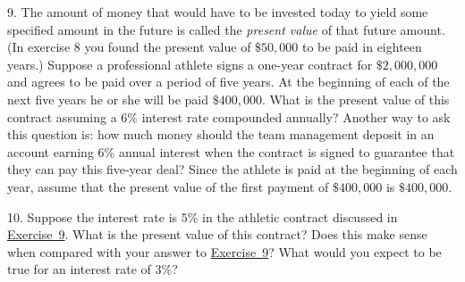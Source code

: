 \documentclass[10pt,]{book}
\theoremstyle{plain}
\theoremstyle{definition}
\theoremstyle{definition}
\theoremstyle{definition}
\numberwithin{equation}{section}
\begin{document}
\begin{exerciselist}
\begin{enumerate}[label=(\alph*)]
\end{enumerate}
\par\smallskip
\item[9.]\hypertarget{athletic-contract}{}\hypertarget{p-230}{}%
The amount of money that would have to be invested today to yield some specified amount in the future is called the \emph{present value} of that future amount.  (In exercise 8 you found the present value of \(\$50,000\) to be paid in eighteen years.)  Suppose a professional athlete signs a one-year contract for \(\$2,000,000\) and agrees to be paid over a period of five years.  At the beginning of each of the next five years he or she will be paid \(\$400,000\).  What is the present value of this contract assuming a \(6\%\) interest rate compounded annually?  Another way to ask this question is: how much money should the team management deposit in an account earning \(6\%\) annual interest when the contract is signed to guarantee that they can pay this five-year deal?  Since the athlete is paid at the beginning of each year, assume that the present value of the first payment of \(\$400,000\) is \(\$400,000\).%
\par\smallskip
\item[10.]\hypertarget{exercise-59}{}\hypertarget{p-231}{}%
Suppose the interest rate is \(5\%\) in the athletic contract discussed in \hyperlink{athletic-contract}{Exercise~9}.  What is the present value of this contract?  Does this make sense when compared with your answer to \hyperlink{athletic-contract}{Exercise~9}?  What would you expect to be true for an interest rate of \(3\%\)?%
\par\smallskip
\end{exerciselist}
\typeout{************************************************}
\typeout{************************************************}
\end{document}
